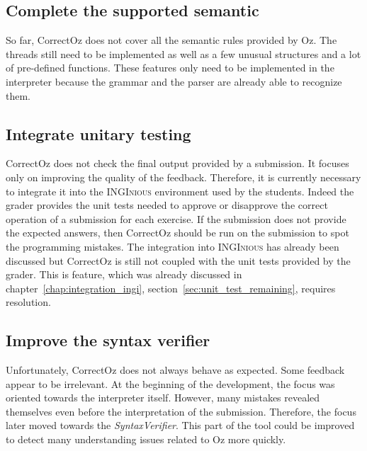 \documentclass[11pt,a4paper,twoside,openright]{report}
\begin{document}
\subsection{Complete the supported semantic}
So far, CorrectOz does not cover all the semantic rules provided by Oz. 
The threads still need to be implemented as well as a few unusual structures 
and a lot of pre-defined functions. These features only need to be implemented 
in the interpreter because the grammar and the parser are already able to 
recognize them.

\subsection{Integrate unitary testing}
CorrectOz does not check the final output provided by a submission. It focuses 
only on improving the quality of the feedback. Therefore, it is currently 
necessary to integrate it into the \textsc{INGInious} environment used by the 
students. Indeed the grader provides the unit tests needed to approve or 
disapprove the correct operation of a 
submission for each exercise. If the submission does not provide the expected 
answers, then CorrectOz should be run on the submission to spot the programming 
mistakes. The integration into \textsc{INGInious} has already been discussed 
but CorrectOz is still not coupled with the unit tests provided by the grader. 
This is feature, which was already discussed in 
chapter~\ref{chap:integration_ingi}, section~\ref{sec:unit_test_remaining}, 
requires resolution.

\subsection{Improve the syntax verifier}
Unfortunately, CorrectOz does not always behave as expected. Some 
feedback appear to be irrelevant. At the beginning of the development, the 
focus was oriented towards the interpreter itself. However, many mistakes 
revealed themselves even before the interpretation of the submission. 
Therefore, the focus later moved towards the \textit{SyntaxVerifier}. This part 
of the tool could be improved to detect many understanding issues 
related to Oz more quickly.
\end{document}
